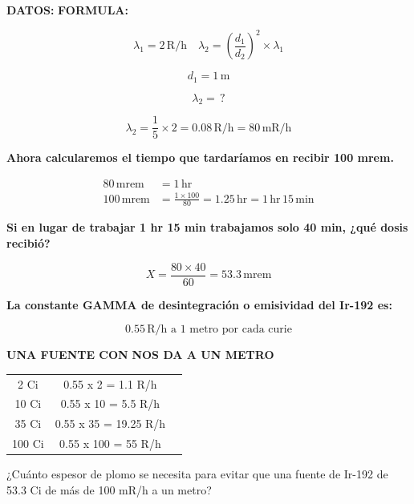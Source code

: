 \begin{center}
\textbf{DATOS:} \quad \textbf{FORMULA:}
\end{center}

\[ \lambda_1 = 2 \, \text{R/h} \quad  \lambda_2 = \left( \frac{d_1}{d_2} \right)^2 \times \lambda_1 \]

\[ d_1 = 1 \, \text{m} \]

\[ \lambda_2 = \, ? \]

\[ \lambda_2 = \frac{1}{5} \times 2 = 0.08 \, \text{R/h} = 80 \, \text{mR/h} \]

\textbf{Ahora calcularemos el tiempo que tardaríamos en recibir 100 mrem.}

\[
\begin{aligned}
80 \, \text{mrem} & = 1 \, \text{hr} \\
100 \, \text{mrem} & = \frac{1 \times 100}{80} = 1.25 \, \text{hr} = 1 \, \text{hr} \, 15 \, \text{min}
\end{aligned}
\]

\textbf{Si en lugar de trabajar 1 hr 15 min trabajamos solo 40 min, ¿qué dosis recibió?}

\[
X = \frac{80 \times 40}{60} = 53.3 \, \text{mrem}
\]

\textbf{La constante GAMMA de desintegración o emisividad del Ir-192 es:}

\[
0.55 \, \text{R/h a 1 metro por cada curie}
\]

\begin{center}
\textbf{UNA FUENTE CON} \quad \textbf{NOS DA A UN METRO}

\begin{tabular}{ccc}
2 Ci & 0.55 x 2 = 1.1 R/h\\
10 Ci & 0.55 x 10 = 5.5 R/h\\
35 Ci & 0.55 x 35 = 19.25 R/h\\
100 Ci & 0.55 x 100 = 55 R/h\\
\end{tabular}
\end{center}

¿Cuánto espesor de plomo se necesita para evitar que una fuente de Ir-192 de 53.3 Ci de más de 100 mR/h a un metro?

